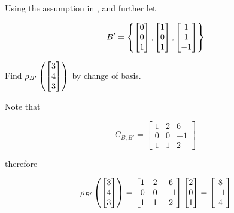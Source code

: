 \documentclass[a4paper,12pt]{article}
\begin{document}
\begin{exm}
  Using the assumption in \rexm[\sctd{3}], and further let

  $$B'=\left\{ \begin{bmatrix}
    0\\
    0\\
    1
  \end{bmatrix},\begin{bmatrix}
    1\\
    0\\
    1
  \end{bmatrix},\begin{bmatrix}
    1\\
    1\\
    -1
  \end{bmatrix}\right\}$$\s

  Find $\rho_{B'}\left( \begin{bmatrix}
    3\\
    4\\
    3
  \end{bmatrix}\right)$ by change of basis.\n

  \ans Note that

  $$C_{B,B'}=\begin{bmatrix}
    1 & 2 & 6\\
    0 & 0 & -1\\
    1 & 1 & 2
  \end{bmatrix}$$\s

  therefore

  $$\rho_{B'}\left( \begin{bmatrix}
    3\\
    4\\
    3
  \end{bmatrix}\right)=\begin{bmatrix}
    1 & 2 & 6\\
    0 & 0 & -1\\
    1 & 1 & 2
  \end{bmatrix}\begin{bmatrix}
    2\\
    0\\
    1
  \end{bmatrix}=\begin{bmatrix}
    8\\
    -1\\
    4
  \end{bmatrix}$$
\end{exm}

\pagebreak
\end{document}
